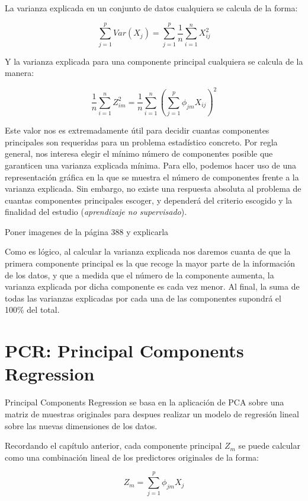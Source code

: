 \documentclass[12pt,a4paper,Spanish]{book}
\begin{document}
La varianza explicada en un conjunto de datos cualquiera se calcula de la forma:

\begin{equation}
\sum_{j=1}^{p}Var(X_j) = \sum_{j=1}^{p}\dfrac{1}{n}\sum_{i=1}^{n}X_{ij}^2
\end{equation}

Y la varianza explicada para una componente principal cualquiera se calcula de la manera:

\begin{equation}
\dfrac{1}{n}\sum_{i=1}^{n}Z_{im}^2 = \dfrac{1}{n}\sum_{i=1}^{n}\left(\sum_{j=1}^{p}\phi_{jm}X_{ij}\right)^2
\end{equation}

Este valor nos es extremadamente útil para decidir cuantas componentes principales son requeridas para un problema estadístico concreto. Por regla general, nos interesa elegir el mínimo número de componentes posible que garanticen una varianza explicada mínima. Para ello, podemos hacer uso de una representación gráfica en la que se muestra el número de componentes frente a la varianza explicada. Sin embargo, no existe una respuesta absoluta al problema de cuantas componentes principales escoger, y dependerá del criterio escogido y la finalidad del estudio (\textit{aprendizaje no supervisado}).

Poner imagenes de la página 388 y explicarla

Como es lógico, al calcular la varianza explicada nos daremos cuanta de que la primera componente principal es la que recoge la mayor parte de la información de los datos, y que a medida que el número de la componente aumenta, la varianza explicada por dicha componente es cada vez menor. Al final, la suma de todas las varianzas explicadas por cada una de las componentes supondrá el 100\% del total.

\chapter{PCR: Principal Components Regression}

Principal Components Regression se basa en la aplicación de PCA sobre una matriz de muestras originales para despues realizar un modelo de regresión lineal sobre las nuevas dimensiones de los datos.

Recordando el capítulo anterior, cada componente principal $Z_m$ se puede calcular como una combinación lineal de los predictores originales de la forma:

\begin{equation}
Z_m=\sum_{j=1}^{p}\phi_{jm}X_{j}
\end{equation}
\end{document}
